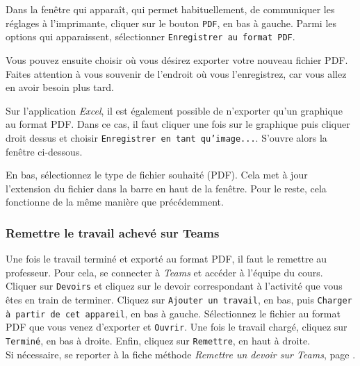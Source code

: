 Dans la fenêtre qui apparaît, qui permet habituellement, de communiquer les réglages à l'imprimante, cliquer sur le bouton \texttt{PDF}, en bas à gauche.  Parmi les options qui apparaissent, sélectionner \texttt{Enregistrer au format PDF}. 


Vous pouvez ensuite choisir où vous désirez exporter votre nouveau fichier PDF. Faites attention à vous souvenir de l'endroit où vous l'enregistrez, car vous allez en avoir besoin plus tard.


Sur l'application \emph{Excel}, il est également possible de n'exporter qu'un graphique au format PDF. Dans ce cas, il faut cliquer une fois sur le graphique puis cliquer droit dessus et choisir \texttt{Enregistrer en tant qu'image...}. S'ouvre alors la fenêtre ci-dessous.


En bas, sélectionnez le type de fichier souhaité (PDF).  Cela met à jour l'extension du fichier dans la barre en haut de la fenêtre.  Pour le reste, cela fonctionne de la même manière que précédemment.



\subsubsection{Remettre le travail achevé sur Teams}

Une fois le travail terminé et exporté au format PDF, il faut le remettre au professeur. Pour cela, se connecter à \emph{Teams} et accéder à l'équipe du cours. Cliquer sur \texttt{Devoirs} et cliquez sur le devoir correspondant à l'activité que vous êtes en train de terminer. Cliquez sur \texttt{Ajouter un travail}, en bas, puis \texttt{Charger à partir de cet appareil}, en bas à gauche. Sélectionnez le fichier au format PDF que vous venez d'exporter et \texttt{Ouvrir}. Une fois le travail chargé, cliquez sur \texttt{Terminé}, en bas à droite. Enfin, cliquez sur \texttt{Remettre}, en haut à droite.\\



Si nécessaire, se reporter à la fiche méthode \emph{Remettre un devoir sur Teams}, page \pageref{TeamsRemettreDevoir}.



